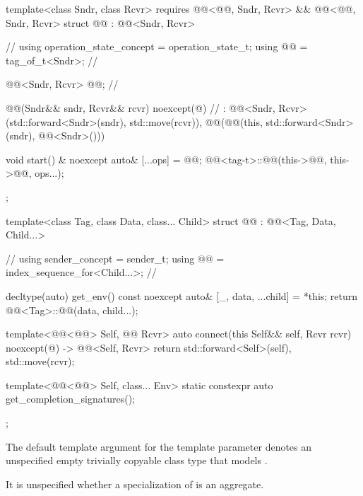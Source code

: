 \begin{codeblock}
{  template<class Sndr, class Rcvr>
    requires @@<@@, Sndr, Rcvr> &&
             @@<@@, Sndr, Rcvr>
  struct @@ : @@<Sndr, Rcvr> {            // \expos
    using operation_state_concept = operation_state_t;
    using @@ = tag_of_t<Sndr>;                               // \expos

    @@<Sndr, Rcvr> @@;                   // \expos

    @@(Sndr&& sndr, Rcvr&& rcvr) noexcept(@\seebelownc@)               // \expos
      : @@<Sndr, Rcvr>(std::forward<Sndr>(sndr), std::move(rcvr)),
        @@(@@(this, std::forward<Sndr>(sndr), @@<Sndr>()))
    {}

    void start() & noexcept {
      auto& [...ops] = @@;
      @@<tag-t>::@@(this->@@, this->@@, ops...);
    }
  };

  template<class Tag, class Data, class... Child>
  struct @@ : @@<Tag, Data, Child...> {     // \expos
    using sender_concept = sender_t;
    using @@ = index_sequence_for<Child...>;           // \expos

    decltype(auto) get_env() const noexcept {
      auto& [_, data, ...child] = *this;
      return @@<Tag>::@@(data, child...);
    }

    template<@@<@@> Self, @@ Rcvr>
    auto connect(this Self&& self, Rcvr rcvr) noexcept(@\seebelow@)
      -> @@<Self, Rcvr> {
      return {std::forward<Self>(self), std::move(rcvr)};
    }

    template<@@<@@> Self, class... Env>
    static constexpr auto get_completion_signatures();
  };
}
\end{codeblock}

\pnum
The default template argument for the  template parameter
denotes an unspecified empty trivially copyable class type
that models .

\pnum
It is unspecified whether a specialization of 
is an aggregate.

